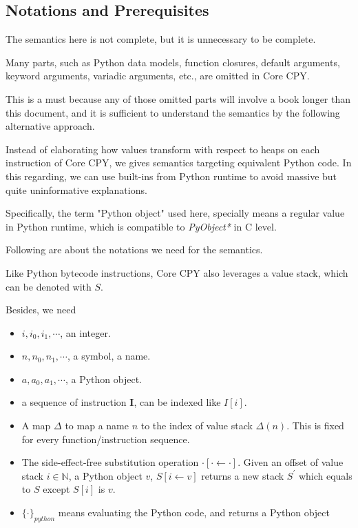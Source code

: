 \documentclass[12pt, a4paper]{report}
\begin{document}
\newpage

\subsection*{Notations and Prerequisites}

The semantics here is not complete, but it is unnecessary to be complete.

Many parts, such as Python data models, function closures, default arguments, keyword arguments, variadic arguments, etc., are omitted in Core CPY.

This is a must because any of those omitted parts will involve a book longer than this document, and it is sufficient to understand
the semantics by the following alternative approach.

Instead of elaborating how values transform with respect to heaps on each instruction of Core CPY,
we gives semantics targeting equivalent Python code. In this regarding, we can use built-ins from Python runtime to
avoid massive but quite uninformative explanations.

Specifically, the term "Python object" used here, specially means a regular value in Python runtime, which is compatible to \textit{PyObject*} in C level.

Following are about the notations we need for the semantics.

Like Python bytecode instructions, Core CPY also leverages a value stack, which can be denoted with $S$.

Besides, we need

\begin{itemize}
    \item $i, i_0, i_1, \cdots$, an integer.
    \item $n, n_0, n_1, \cdots$, a symbol, a name.
    \item $a, a_0, a_1, \cdots$, a Python object.
    \item a sequence of instruction $\mathbf{I}$, can be indexed like $I[i]$.
    \item A map $\Delta$ to map a name $n$ to the index of value stack $\Delta(n)$. This is fixed for every function/instruction sequence.
    \item The side-effect-free substitution operation $\cdot[\cdot \leftarrow \cdot]$.
          Given an offset of value stack $i \in \mathbb{N}$, a Python object $v$,
          $S[i \leftarrow v]$ returns a new stack $S^{'}$ which equals to $S$ except $S[i]$ is $v$.
    \item $\{\cdot\}_{python}$ means evaluating the Python code, and returns a Python object
\end{itemize}
\end{document}
